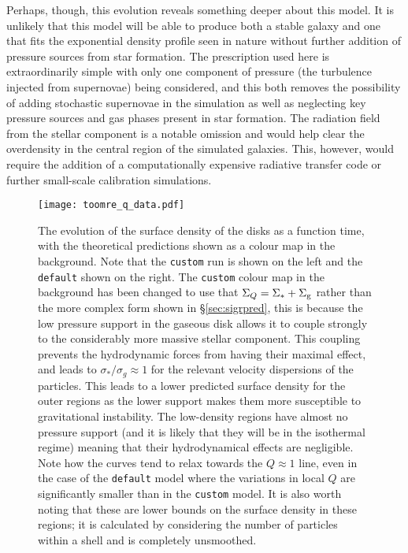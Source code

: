 Perhaps, though, this evolution reveals something deeper about this model.
It is unlikely that this model will be able to produce both a stable galaxy and one that fits the exponential density profile seen in nature without further addition of pressure sources from star formation.
The prescription used here is extraordinarily simple with only one component of pressure (the turbulence injected from supernovae) being considered, and this both removes the possibility of adding stochastic supernovae in the simulation as well as neglecting key pressure sources and gas phases present in star formation.
The radiation field from the stellar component is a notable omission and would help clear the overdensity in the central region of the simulated galaxies.
This, however, would require the addition of a computationally expensive radiative transfer code or further small-scale calibration simulations.


\begin{figure}
    \centering
    \texttt{[image: toomre\_q\_data.pdf]}
    \caption{The evolution of the surface density of the disks as a function time, with the theoretical predictions shown as a colour map in the background. Note that the {\tt custom} run is shown on the left and the {\tt default} shown on the right. The {\tt custom} colour map in the background has been changed to use that $\Sigma_Q = \Sigma_* + \Sigma_\mathrm{g}$ rather than the more complex form shown in \S \ref{sec:sigrpred}, this is because the low pressure support in the gaseous disk allows it to couple strongly to the considerably more massive stellar component. This coupling prevents the hydrodynamic forces from having their maximal effect, and leads to $\sigma_*/\sigma_g \approx 1$ for the relevant velocity dispersions of the particles. This leads to a lower predicted surface density for the outer regions as the lower support makes them more susceptible to gravitational instability. The low-density regions have almost no pressure support (and it is likely that they will be in the isothermal regime) meaning that their hydrodynamical effects are negligible. Note how the curves tend to relax towards the $Q\approx1$ line, even in the case of the {\tt default} model where the variations in local $Q$ are significantly smaller than in the {\tt custom} model. It is also worth noting that these are lower bounds on the surface density in these regions; it is calculated by considering the number of particles within a shell and is completely unsmoothed.}
    \label{fig:toomreqthr_dat}
\end{figure}

